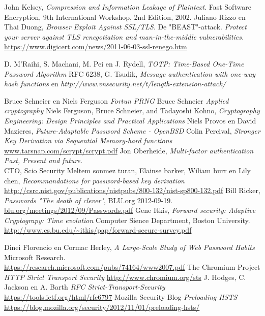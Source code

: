 \documentclass[11pt]{article}
\begin{document}
\begin{thebibliography}{9}
  John Kelsey,
  \emph{{{C}ompression and {I}nformation {L}eakage of {P}laintext}}.
  Fast Software Encryption, 9th International Workshop,
  2nd Edition,
  2002.
	Juliano Rizzo en Thai Duong,
	\emph{Browser Exploit Against SSL/TLS}. De "BEAST"-attack.
	\emph{Protect your server against TLS renegotiation and man-in-the-middle vulnerabilities.}
	\url{https://www.digicert.com/news/2011-06-03-ssl-renego.htm}

	 D. M'Raihi,  S. Machani, M. Pei en  J. Rydell,
	 \emph{TOTP: Time-Based One-Time Password Algorithm}
	 RFC 6238,
	G. Tsudik,
	\emph{Message authentication with one-way hash functions} en
	\emph{http://www.vnsecurity.net/t/length-extension-attack/}
	
	Bruce Schneier en Niels Ferguson
	\emph{Fortun PRNG}
	Bruce Schneier
	\emph{Applied cryptography}
	Niels Ferguson, Bruce Schneier, and Tadayoshi Kohno,
	\emph{Cryptography Engineering: Design Principles and Practical Applications}
	Niels Provos en David Mazieres,
	\emph{Future-Adaptable Password Scheme - OpenBSD}
	Colin Percival,
	\emph{Stronger Key Derivation via Sequential Memory-hard functions}
	\url{www.tarsnap.com/scrypt/scrypt.pdf}
	Jon Oberheide,
	\emph{Multi-factor authentication Past, Present and future}.\\
	CTO, Scio Security
	Meltem sonmez turan, Elainse barker, Wiliam burr en Lily chen,
	\emph{Recommandations for password-based key derivation}\\
	\url{http://csrc.nist.gov/publications/nistpubs/800-132/nist-sp800-132.pdf}
	Bill Ricker,
	\emph{Passwords "The death of clever"}, 
	BLU.org 2012-09-19. \\
	\url{blu.org/meetings/2012/09/Passwords.pdf‎}
	Gene Itkis,
	\emph{Forward security: Adaptive Cryptograpy: Time evolution}
	Computer Sience Department, Boston University.\\
	\url{http://www.cs.bu.edu/~itkis/pap/forward-secure-survey.pdf}
	
	Dinei Florencio en Cormac Herley,
	\emph{A Large-Scale Study of Web Password Habits}
	Microsoft Research.\\
	\url{https://research.microsoft.com/pubs/74164/www2007.pdf}
  The Chromium Project
  \emph{HTTP Strict Transport Security}
  \url{http://www.chromium.org/sts}
  J. Hodges, C. Jackson en A. Barth
  \emph{RFC Strict-Transport-Security}
  \url{https://tools.ietf.org/html/rfc6797}
  Mozilla Security Blog
  \emph{Preloading HSTS}
  \url{https://blog.mozilla.org/security/2012/11/01/preloading-hsts/}
\end{thebibliography}
\end{document}
